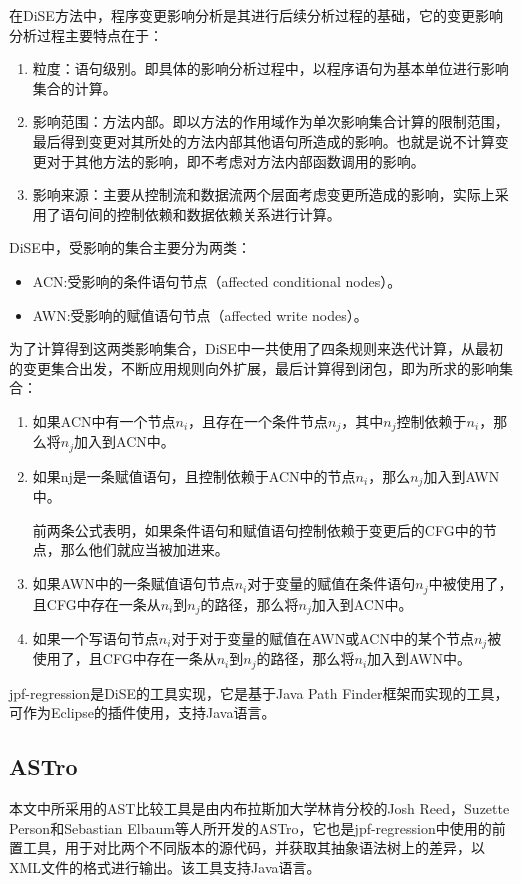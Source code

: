 在DiSE方法中，程序变更影响分析是其进行后续分析过程的基础，它的变更影响分析过程主要特点在于：
\begin{enumerate}
	\item 粒度：语句级别。即具体的影响分析过程中，以程序语句为基本单位进行影响集合的计算。
	\item 影响范围：方法内部。即以方法的作用域作为单次影响集合计算的限制范围，最后得到变更对其所处的方法内部其他语句所造成的影响。也就是说不计算变更对于其他方法的影响，即不考虑对方法内部函数调用的影响。
	\item 影响来源：主要从控制流和数据流两个层面考虑变更所造成的影响，实际上采用了语句间的控制依赖和数据依赖关系进行计算。
\end{enumerate}

DiSE中，受影响的集合主要分为两类：
\begin{itemize}
	\item ACN:受影响的条件语句节点（affected conditional nodes）。
	\item AWN:受影响的赋值语句节点（affected write nodes）。
\end{itemize}

为了计算得到这两类影响集合，DiSE中一共使用了四条规则来迭代计算，从最初的变更集合出发，不断应用规则向外扩展，最后计算得到闭包，即为所求的影响集合：
\begin{enumerate}
	\item 如果ACN中有一个节点$n_i$，且存在一个条件节点$n_j$，其中$n_j$控制依赖于$n_i$，那么将$n_j$加入到ACN中。
	\item 如果nj是一条赋值语句，且控制依赖于ACN中的节点$n_i$，那么$n_j$加入到AWN中。
	     
	前两条公式表明，如果条件语句和赋值语句控制依赖于变更后的CFG中的节点，那么他们就应当被加进来。
	     
	\item 如果AWN中的一条赋值语句节点$n_i$对于变量的赋值在条件语句$n_j$中被使用了，且CFG中存在一条从$n_i$到$n_j$的路径，那么将$n_j$加入到ACN中。

	\item 如果一个写语句节点$n_i$对于对于变量的赋值在AWN或ACN中的某个节点$n_j$被使用了，且CFG中存在一条从$n_i$到$n_j$的路径，那么将$n_i$加入到AWN中。

\end{enumerate}

jpf-regression是DiSE的工具实现，它是基于Java Path Finder框架\cite{havelund2000mode}而实现的工具，可作为Eclipse的插件使用，支持Java语言。

\subsection{ASTro}	

	本文中所采用的AST比较工具是由内布拉斯加大学林肯分校的Josh Reed，Suzette Person和Sebastian Elbaum等人所开发的ASTro，它也是jpf-regression中使用的前置工具，用于对比两个不同版本的源代码，并获取其抽象语法树上的差异，以XML文件的格式进行输出。该工具支持Java语言。
	